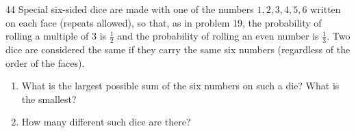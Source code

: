 \begin{probbox}{44}{}
Special six-sided dice are made with one of the numbers $1,2,3,4,5,6$ written on each face (repeats allowed), so that, as in
problem 19, the probability of rolling a multiple of $3$ is $\frac12$ and the probability of rolling an even number is $\frac13$.
Two dice are considered the same if they carry the same six numbers (regardless of the order of the faces).
\begin{enumerate}[label=\alph*),leftmargin=1.6em,itemsep=1pt,topsep=2pt]
\item What is the largest possible sum of the six numbers on such a die? What is the smallest?
\item How many different such dice are there?
\end{enumerate}
\end{probbox}
